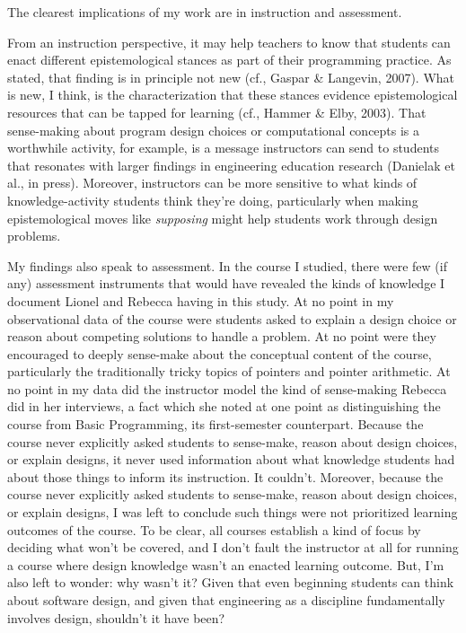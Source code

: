 The clearest implications of my work are in instruction and assessment.

From an instruction perspective, it may help teachers to know that
students can enact different epistemological stances as part of their
programming practice. As stated, that finding is in principle not new
(cf., Gaspar \& Langevin, 2007). What is new, I think, is the
characterization that these stances evidence epistemological resources
that can be tapped for learning (cf., Hammer \& Elby, 2003). That
sense-making about program design choices or computational concepts is a
worthwhile activity, for example, is a message instructors can send to
students that resonates with larger findings in engineering education
research (Danielak et al., in press). Moreover, instructors can be more
sensitive to what kinds of knowledge-activity students think they're
doing, particularly when making epistemological moves like
\emph{supposing} might help students work through design problems.

My findings also speak to assessment. In the course I studied, there
were few (if any) assessment instruments that would have revealed the
kinds of knowledge I document Lionel and Rebecca having in this study.
At no point in my observational data of the course were students asked
to explain a design choice or reason about competing solutions to handle
a problem. At no point were they encouraged to deeply sense-make about
the conceptual content of the course, particularly the traditionally
tricky topics of pointers and pointer arithmetic. At no point in my data
did the instructor model the kind of sense-making Rebecca did in her
interviews, a fact which she noted at one point as distinguishing the
course from Basic Programming, its first-semester counterpart. Because
the course never explicitly asked students to sense-make, reason about
design choices, or explain designs, it never used information about what
knowledge students had about those things to inform its instruction. It
couldn't. Moreover, because the course never explicitly asked students
to sense-make, reason about design choices, or explain designs, I was
left to conclude such things were not prioritized learning outcomes of
the course. To be clear, all courses establish a kind of focus by
deciding what won't be covered, and I don't fault the instructor at all
for running a course where design knowledge wasn't an enacted learning
outcome. But, I'm also left to wonder: why wasn't it? Given that even
beginning students can think about software design, and given that
engineering as a discipline fundamentally involves design, shouldn't it
have been?

